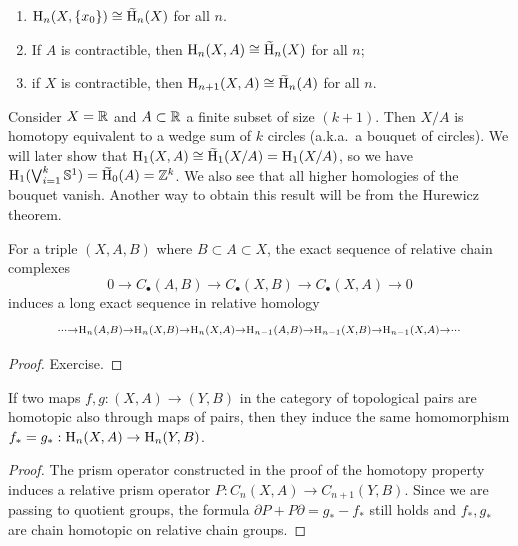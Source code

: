 \begin{cor}
    \begin{enumerate}
        \item $\rmH_n(X,
        \{x_0\})\cong\wt{\rmH}_n(X)$ for all $n$.
        \item If $A$ is contractible, then $\rmH_n(X,A)\cong \wt{\rmH}_n(X)$ for all $n$;
        \item if $X$ is contractible, then $\rmH_{n+1}(X,A)\cong \wt{\rmH}_n(A)$ for all $n$.
    \end{enumerate}
\end{cor}

\begin{example}
    Consider $X=\mathbb{R}$ and $A\subset \mathbb{R}$ a finite subset of size $(k+1)$. Then $X/A$ is homotopy equivalent to a wedge sum of $k$ circles (a.k.a.\ a bouquet of circles). We will later show that $\rmH_1(X,A)\cong \wt{\rmH}_1(X/A)= \rmH_1(X/A)$, so we have $\rmH_1(\bigvee_{i=1}^{k}\bbS^1)=\wt{\rmH}_0(A)=\bbZ^{k}$. We also see that all higher homologies of the bouquet vanish. Another way to obtain this result will be from the Hurewicz theorem.
\end{example}



\begin{prop}\label{exact sequence of a triple}
    For a triple $(X,A,B)$ where $B\subset A\subset X$, the exact sequence of relative chain complexes
    \[0\to C_\bullet(A,B)\to C_\bullet (X,B)\to C_\bullet(X,A)\to 0 \]
    induces a long exact sequence in relative homology
    \[\scriptstyle
    \cdots \to \mathrm{H}_n(A,B)\to \mathrm{H}_n(X,B)\to \mathrm{H}_n(X,A)\to \mathrm{H}_{n-1}(A,B)\to \mathrm{H}_{n-1}(X,B)\to \mathrm{H}_{n-1}(X,A)\to \cdots
    \]
\end{prop}
\begin{proof}
     Exercise.
\end{proof}


\begin{prop}
    If two maps $f,g:(X,A)\to (Y,B)$ in the category of topological pairs are homotopic also through maps of pairs, then they induce the same homomorphism $f_\ast=g_\ast:\mathrm{H}_n(X,A)\to \mathrm{H}_n(Y,B)$.
\end{prop}
\begin{proof}
     The prism operator constructed in the proof of the homotopy property induces a relative prism operator $P:C_n(X,A)\to C_{n+1}(Y,B)$. Since we are passing to quotient groups, the formula $\partial P+P\partial=g_\ast-f_\ast$ still holds and $f_\ast,g_\ast$ are chain homotopic on relative chain groups. 
\end{proof}


